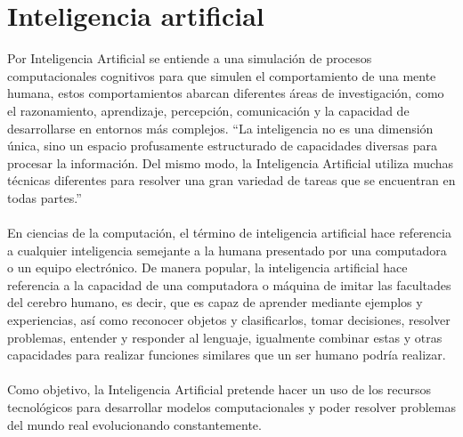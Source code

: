 \documentclass[12pt, a4paper, titlepage]{report}
\begin{document}
		\section{Inteligencia artificial}
		Por Inteligencia Artificial se entiende a una simulación de procesos computacionales cognitivos para que simulen el comportamiento de una mente humana, estos comportamientos abarcan diferentes áreas de investigación, como el razonamiento, aprendizaje, percepción, comunicación y la capacidad de desarrollarse en entornos más complejos.
		“La inteligencia no es una dimensión única, sino un espacio profusamente estructurado de capacidades diversas para procesar la información. Del mismo modo, la Inteligencia Artificial utiliza muchas técnicas diferentes para resolver una gran variedad de tareas que se encuentran en todas partes.” \cite{Inteligencia_Artificial}\\\\
		En ciencias de la computación, el término de inteligencia artificial hace referencia a cualquier inteligencia semejante a la humana presentado por una computadora o un equipo electrónico. De manera popular, la inteligencia artificial hace referencia a la capacidad de una computadora o máquina de imitar las facultades del cerebro humano, es decir, que es capaz de aprender mediante ejemplos y experiencias, así como reconocer objetos y clasificarlos, tomar decisiones, resolver problemas, entender y responder al lenguaje, igualmente combinar estas y otras capacidades para realizar funciones similares que un ser humano podría realizar. \cite{refInteligencia_Artificial2}\\\\
		Como objetivo, la Inteligencia Artificial pretende hacer un uso de los recursos tecnológicos para desarrollar modelos computacionales y poder resolver problemas del mundo real evolucionando constantemente.
\end{document}
